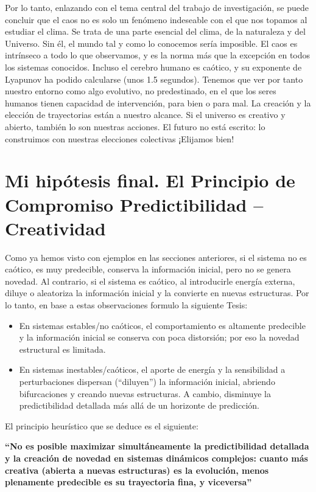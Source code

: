 \documentclass[
  11pt,
  a4paper,
  DIV=11,
  numbers=noendperiod]{scrreprt}
\begin{document}
Por lo tanto, enlazando con el tema central del trabajo de
investigación, se puede concluir que el caos no es solo un fenómeno
indeseable con el que nos topamos al estudiar el clima. Se trata de una
parte esencial del clima, de la naturaleza y del Universo. Sin él, el
mundo tal y como lo conocemos sería imposible. El caos es intrínseco a
todo lo que observamos, y es la norma más que la excepción en todos los
sistemas conocidos. Incluso el cerebro humano es caótico, y su exponente
de Lyapunov ha podido calcularse (unos 1.5 segundos). Tenemos que ver
por tanto nuestro entorno como algo evolutivo, no predestinado, en el
que los seres humanos tienen capacidad de intervención, para bien o para
mal. La creación y la elección de trayectorias están a nuestro alcance.
Si el universo es creativo y abierto, también lo son nuestras acciones.
El futuro no está escrito: lo construimos con nuestras elecciones
colectivas ¡Elijamos bien!

\chapter{Mi hipótesis final. El Principio de Compromiso Predictibilidad
--
Creatividad}\label{mi-hipuxf3tesis-final.-el-principio-de-compromiso-predictibilidad-creatividad}

Como ya hemos visto con ejemplos en las secciones anteriores, si el
sistema no es caótico, es muy predecible, conserva la información
inicial, pero no se genera novedad. Al contrario, si el sistema es
caótico, al introducirle energía externa, diluye o aleatoriza la
información inicial y la convierte en nuevas estructuras. Por lo tanto,
en base a estas observaciones formulo la siguiente Tesis:

\begin{itemize}
\item
  En sistemas estables/no caóticos, el comportamiento es altamente
  predecible y la información inicial se conserva con poca distorsión;
  por eso la novedad estructural es limitada.
\item
  En sistemas inestables/caóticos, el aporte de energía y la
  sensibilidad a perturbaciones dispersan (``diluyen'') la información
  inicial, abriendo bifurcaciones y creando nuevas estructuras. A
  cambio, disminuye la predictibilidad detallada más allá de un
  horizonte de predicción.
\end{itemize}

El principio heurístico que se deduce es el siguiente:

\textbf{``No es posible maximizar simultáneamente la predictibilidad
detallada y la creación de novedad en sistemas dinámicos complejos:
cuanto más creativa (abierta a nuevas estructuras) es la evolución,
menos plenamente predecible es su trayectoria fina, y viceversa''}
\end{document}
